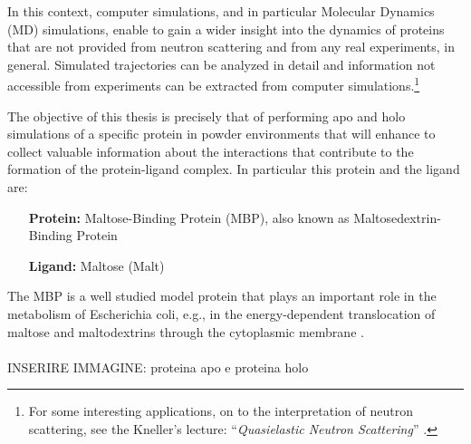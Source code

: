 In this context, computer simulations, and in particular Molecular Dynamics (MD) simulations, enable to gain a wider insight into the dynamics of proteins that are not provided from neutron scattering and from any real experiments, in general. 
Simulated trajectories can be analyzed in detail and information not accessible from experiments can be extracted from computer simulations.\footnote{For some interesting applications, on to the interpretation of neutron scattering, see the Kneller's lecture: ``\textit{Quasielastic Neutron Scattering}'' \cite{ref:QNS_Keller}.}

The objective of this thesis is precisely that of performing apo and holo simulations of a specific protein in powder environments that will enhance to collect valuable information about the interactions that contribute to the formation of the protein-ligand complex. In particular this protein and the ligand are:
\begin{center}
\begin{minipage}{0.65\textwidth}
\begin{itemize}
\item[\textbf{Protein:}] Maltose-Binding Protein (MBP), also known as Maltosedextrin-Binding Protein
\vspace{-0.2cm}
\item[\textbf{Ligand:}] Maltose (Malt)
\end{itemize}
\end{minipage}
\end{center}
The MBP is a well studied model protein that plays an important role in the metabolism of Escherichia coli, e.g., in the energy-dependent translocation of maltose and maltodextrins through the cytoplasmic membrane \cite{paciaroni2008fingerprints}.\\
\\
INSERIRE IMMAGINE: proteina apo e proteina holo\\


